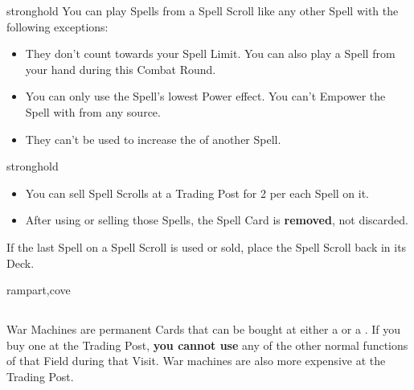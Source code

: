 \begin{multicols*}{2}
\begin{expansion}{stronghold}
You can play Spells from a Spell Scroll like any other Spell with the following exceptions:
\begin{itemize}
    \item They don't count towards your Spell Limit.
    You can also play a Spell from your hand during this Combat Round.
    \item You can only use the Spell's lowest Power  effect.
    You can't Empower the Spell with  from any source.
    \item They can't be used to increase the  of another Spell.
\end{itemize}
\end{expansion}
\columnbreak
\begin{expansion}{stronghold}
    \begin{itemize}
    \item You can sell Spell Scrolls at a Trading Post for 2  per each Spell on it.
    \item After using or selling those Spells, the Spell Card is \textbf{removed}, not discarded.
\end{itemize}

If the last Spell on a Spell Scroll is used or sold, place the Spell Scroll back in its Deck.
\end{expansion}
\vspace*{1em}
\begin{expansion}{rampart,cove}
  \subsection*{}

  War Machines are permanent Cards that can be bought at either a  or a .
  If you buy one at the Trading Post, \textbf{you cannot use} any of the other normal functions of that Field during that Visit.
  War machines are also more expensive at the Trading Post.

  {
    \bigskip
    \centering
    \begin{scriptsize}
    \end{scriptsize}

}
\end{expansion}
\end{multicols*}
